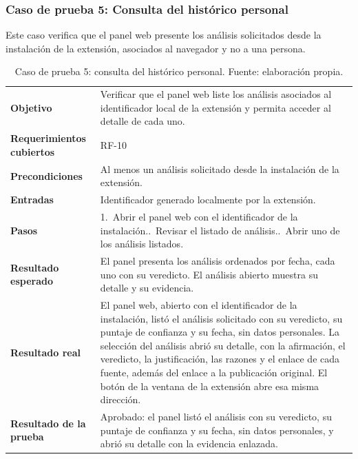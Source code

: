 \subsubsection{Caso de prueba 5: Consulta del histórico personal}

Este caso verifica que el panel web presente los análisis solicitados desde la instalación de la extensión, asociados al navegador y no a una persona.

\begin{small}
\begin{longtable}{@{}>{\raggedright\arraybackslash}p{3.4cm} p{11.8cm}@{}}
  \caption{Caso de prueba 5: consulta del histórico personal. Fuente: elaboración propia.}
  \label{tab:cp-05} \\
    \hline
    \textbf{Objetivo} & Verificar que el panel web liste los análisis asociados al identificador local de la extensión y permita acceder al detalle de cada uno. \\
    \textbf{Requerimientos cubiertos} & RF-10 \\
    \textbf{Precondiciones} & Al menos un análisis solicitado desde la instalación de la extensión. \\
    \textbf{Entradas} & Identificador generado localmente por la extensión. \\
    \textbf{Pasos} & 1.~Abrir el panel web con el identificador de la instalación.\newline 2.~Revisar el listado de análisis.\newline 3.~Abrir uno de los análisis listados. \\
    \textbf{Resultado esperado} & El panel presenta los análisis ordenados por fecha, cada uno con su veredicto. El análisis abierto muestra su detalle y su evidencia. \\
    \textbf{Resultado real} & El panel web, abierto con el identificador de la instalación, listó el análisis solicitado con su veredicto, su puntaje de confianza y su fecha, sin datos personales. La selección del análisis abrió su detalle, con la afirmación, el veredicto, la justificación, las razones y el enlace de cada fuente, además del enlace a la publicación original. El botón de la ventana de la extensión abre esa misma dirección. \\
    \textbf{Resultado de la prueba} & Aprobado: el panel listó el análisis con su veredicto, su puntaje de confianza y su fecha, sin datos personales, y abrió su detalle con la evidencia enlazada. \\
    \hline
\end{longtable}
\end{small}

